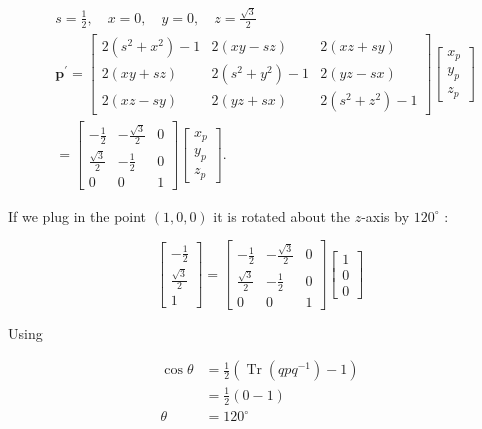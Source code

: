 $$
\begin{aligned}
& s=\frac{1}{2}, \quad x=0, \quad y=0, \quad z=\frac{\sqrt{3}}{2} \\
& \mathbf{p}^{\prime}=\left[\begin{array}{ccc}2\left(s^{2}+x^{2}\right)-1 & 2(x y-s z) & 2(x z+s y) \\2(x y+s z) & 2\left(s^{2}+y^{2}\right)-1 & 2(y z-s x) \\2(x z-s y) & 2(y z+s x) & 2\left(s^{2}+z^{2}\right)-1\end{array}\right]\left[\begin{array}{l}x_{p} \\y_{p} \\z_{p}\end{array}\right] \\
& =\left[\begin{array}{ccc}-\frac{1}{2} & -\frac{\sqrt{3}}{2} & 0 \\\frac{\sqrt{3}}{2} & -\frac{1}{2} & 0 \\0 & 0 & 1\end{array}\right]\left[\begin{array}{l}x_{p} \\y_{p} \\z_{p}\end{array}\right] \text {. }
\end{aligned}
$$

If we plug in the point $(1,0,0)$ it is rotated about the $z$-axis by $120^{\circ}$ :

$$
\left[\begin{array}{c}
-\frac{1}{2} \\
\frac{\sqrt{3}}{2} \\
1
\end{array}\right]=\left[\begin{array}{ccc}
-\frac{1}{2} & -\frac{\sqrt{3}}{2} & 0 \\
\frac{\sqrt{3}}{2} & -\frac{1}{2} & 0 \\
0 & 0 & 1
\end{array}\right]\left[\begin{array}{l}
1 \\
0 \\
0
\end{array}\right]
$$

Using

$$
\begin{aligned}
\cos \theta & =\frac{1}{2}\left(\operatorname{Tr}\left(q p q^{-1}\right)-1\right) \\
& =\frac{1}{2}(0-1) \\
\theta & =120^{\circ}
\end{aligned}
$$

